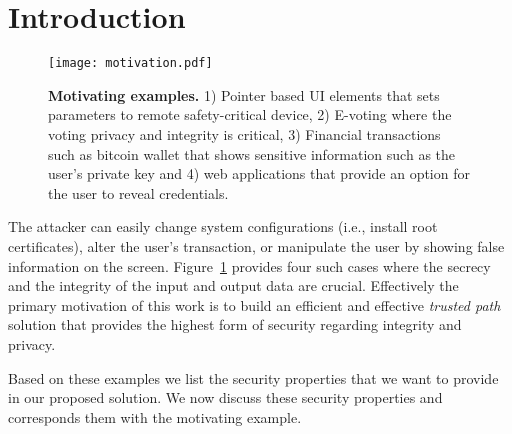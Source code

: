 \section{Introduction}
\label{sec:intro}

\begin{figure}[t]
\centering
\texttt{[image: motivation.pdf]}
\caption{\textbf{Motivating examples.} 1) Pointer based UI elements that sets parameters to remote safety-critical device, 2) E-voting where the voting privacy and integrity is critical, 3) Financial transactions such as bitcoin wallet that shows sensitive information such as the user's private key and 4) web applications that provide an option for the user to reveal credentials.}
\label{fig:motivation}
\centering
\end{figure}

 The attacker can easily change system configurations (i.e., install root certificates), alter the user's transaction, or manipulate the user by showing false information on the screen. Figure~\ref{fig:motivation} provides four such cases where the secrecy and the integrity of the input and output data are crucial. Effectively the primary motivation of this work is to build an efficient and effective \emph{trusted path} solution that provides the highest form of security regarding integrity and privacy. 

Based on these examples we list the security properties that we want to provide in our proposed solution. We now discuss these security properties and corresponds them with the motivating example.

